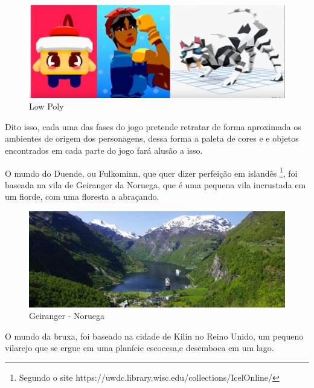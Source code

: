 \begin{figure}[htb]
    \caption{\label{fig_lowpoly}Low Poly}
    \begin{center}
        \includegraphics[width=\textwidth]{imagens/lowPoly.jpg}
    \end{center}
\end{figure}

Dito isso, cada uma das fases do jogo pretende retratar de forma aproximada os ambientes de origem dos personagens, dessa forma a paleta de cores e e objetos encontrados em cada parte do jogo fará alusão a isso.

O mundo do Duende, ou Fulkominn, que quer dizer perfeição em islandês \footnote{Segundo o site https://uwdc.library.wisc.edu/collections/IcelOnline/}, foi baseada na vila de Geiranger da Noruega, que é uma pequena vila incrustada em um fiorde, com uma floresta a abraçando.

\clearpage

\begin{figure}[htb]
    \caption{\label{fig_mundoDuende}Geiranger - Noruega}
    \begin{center}
        \includegraphics[width=\textwidth]{imagens/geiranger.jpeg}
    \end{center}
\end{figure}



O mundo da bruxa, foi baseado na cidade de Kilin no Reino Unido, um pequeno vilarejo que se ergue em uma planície escocesa,e desemboca em um lago.

